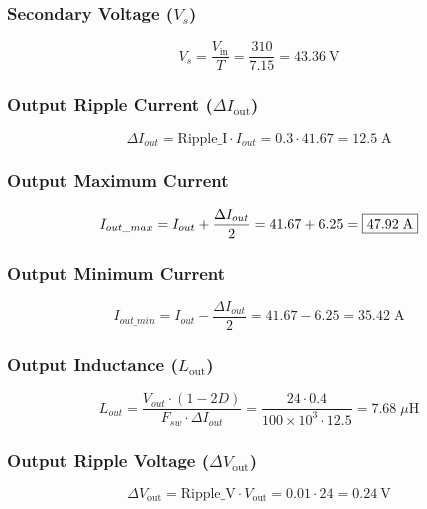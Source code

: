 \subsubsection*{Secondary Voltage (\(V_s\))}
\begin{equation}
V_s = \frac{V_{\text{in}}}{T} = \frac{310}{7.15} = \boxed{\SI{43.36}{\volt}}
\end{equation}

\subsubsection*{Output Ripple Current (\(\Delta I_{\text{out}}\))}
\begin{equation}
\Delta I_{out} = \text{Ripple\_I} \cdot I_{out} = 0.3 \cdot 41.67 = \boxed{12.5\;\text{A}}
\end{equation}

\subsubsection*{Output Maximum Current}
\begin{equation}
I_{out\_max} = I_{out} + \frac{\Delta I_{out}}{2} = 41.67 + 6.25 = \boxed{47.92\;\text{A}} \\
\end{equation}

\subsubsection*{Output Minimum Current}
\begin{equation}
I_{out\_min} = I_{out} - \frac{\Delta I_{out}}{2} = 41.67 - 6.25 = \boxed{35.42\;\text{A}}
\end{equation}

\subsubsection*{Output Inductance (\(L_{\text{out}}\))}
\begin{equation}
L_{out} = \frac{V_{out} \cdot (1 - 2D)}{F_{sw} \cdot \Delta I_{out}} = \frac{24 \cdot 0.4}{100 \times 10^3 \cdot 12.5} = \boxed{7.68\;\mu\text{H}}
\end{equation}

\subsubsection*{Output Ripple Voltage (\(\Delta V_{\text{out}}\))}
\begin{equation}
\Delta V_{\text{out}} = \text{Ripple\_V} \cdot V_{\text{out}} = 0.01 \cdot 24 = \boxed{\SI{0.24}{\volt}}
\end{equation}

